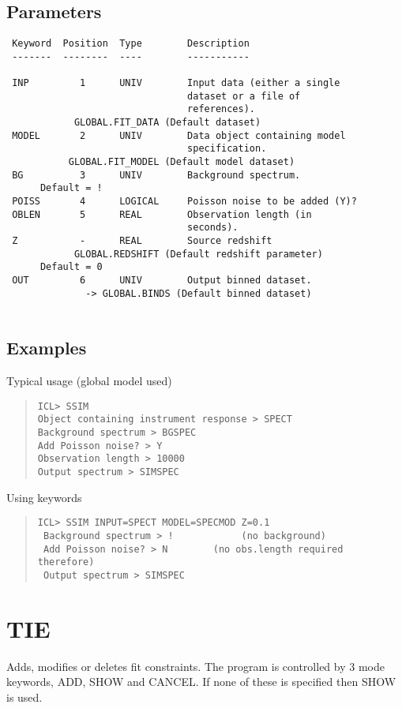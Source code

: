\documentclass{book}
\renewcommand{\_}{{\tt\char'137}}     %
\begin{document}
\subsection{Parameters}
\begin{verbatim}
 Keyword  Position  Type        Description
 -------  --------  ----        -----------
 
 INP         1      UNIV        Input data (either a single
                                dataset or a file of
                                references).
            GLOBAL.FIT_DATA (Default dataset)
 MODEL       2      UNIV        Data object containing model
                                specification.
           GLOBAL.FIT_MODEL (Default model dataset)
 BG          3      UNIV        Background spectrum.
      Default = !
 POISS       4      LOGICAL     Poisson noise to be added (Y)?
 OBLEN       5      REAL        Observation length (in
                                seconds).
 Z           -      REAL        Source redshift
            GLOBAL.REDSHIFT (Default redshift parameter)
      Default = 0
 OUT         6      UNIV        Output binned dataset.
              -> GLOBAL.BINDS (Default binned dataset)
 
\end{verbatim}\subsection{Examples}
Typical usage (global model used)
\begin{quote}\begin{verbatim}
ICL> SSIM
Object containing instrument response > SPECT
Background spectrum > BGSPEC
Add Poisson noise? > Y
Observation length > 10000
Output spectrum > SIMSPEC
\end{verbatim}\end{quote}
Using keywords
\begin{quote}\begin{verbatim}
ICL> SSIM INPUT=SPECT MODEL=SPECMOD Z=0.1
 Background spectrum > !            (no background)
 Add Poisson noise? > N        (no obs.length required therefore)
 Output spectrum > SIMSPEC
\end{verbatim}\end{quote}
\section{TIE}
Adds, modifies or deletes fit constraints. The program is controlled
by 3 mode keywords, ADD, SHOW and CANCEL. If none of these is specified
then SHOW is used.
 
\end{document}
